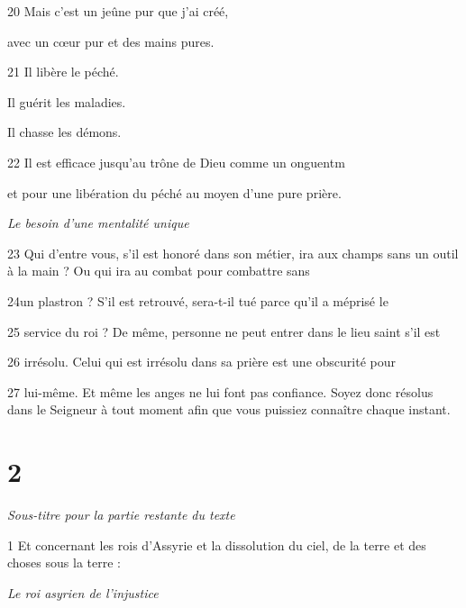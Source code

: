 \par 20 Mais c'est un jeûne pur que j'ai créé,

\par avec un cœur pur et des mains pures.

\par 21 Il libère le péché.

\par Il guérit les maladies.

\par Il chasse les démons.

\par 22 Il est efficace jusqu'au trône de Dieu comme un onguentm

\par et pour une libération du péché au moyen d'une pure prière.

\par \textit{Le besoin d'une mentalité unique}

\par 23 Qui d'entre vous, s'il est honoré dans son métier, ira aux champs sans un outil à la main ? Ou qui ira au combat pour combattre sans

\par 24un plastron ? S'il est retrouvé, sera-t-il tué parce qu'il a méprisé le

\par 25 service du roi ? De même, personne ne peut entrer dans le lieu saint s'il est

\par 26 irrésolu. Celui qui est irrésolu dans sa prière est une obscurité pour

\par 27 lui-même. Et même les anges ne lui font pas confiance. Soyez donc résolus dans le Seigneur à tout moment afin que vous puissiez connaître chaque instant.

\chapter{2}

\par \textit{Sous-titre pour la partie restante du texte}

\par 1 Et concernant les rois d'Assyrie et la dissolution du ciel, de la terre et des choses sous la terre :

\par \textit{Le roi asyrien de l'injustice}

